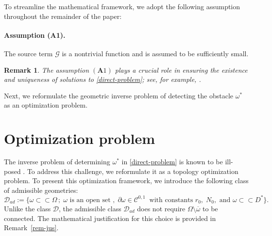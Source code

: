 \documentclass[a4paper,12pt,reqno,natbib]{amsart}
\newtheorem{remark}[theorem]{Remark}
\begin{document}
To streamline the mathematical framework, we adopt the following assumption throughout the remainder of the paper: 


\paragraph{\textbf{Assumption (A1).}}  
The source term \( \mathcal{G} \) is a nontrivial function and is assumed to be sufficiently small.



\begin{remark} The assumption $(\textbf{A}1)$ plays a crucial role in ensuring the existence and uniqueness of solutions to \eqref{direct-problem}; see, for example, \cite[Section 3.5.2]{temam1973theory}. 
\end{remark}



Next, we reformulate the geometric inverse problem of detecting the obstacle \( \omega^* \) as an optimization problem.






\section{Optimization problem}\label{sec:optimization-problem}

The inverse problem of determining $\omega^*$ in \eqref{direct-problem} is known to be ill-posed \cite{AlvarezIPPIP2005,doubova2007identification}. To address this challenge, we reformulate it as a topology optimization problem. To present this optimization framework, we introduce the following class of admissible geometries:
\begin{equation}\label{D-ad}
    \mathcal{D}_{ad}:=\big\{ \omega\subset\subset\Omega\,;\; \omega\text{ is an open set },\; \partial\omega\in\mathcal{C}^{0,1}\;\;\text{with constants } r_0,\; N_0,\text{ and } \omega\subset\subset D^* \big\}.
\end{equation}
Unlike the class $\mathcal{D}$, the admissible class $\mathcal{D}_{ad}$ does not require $\Omega \setminus \overline{\omega}$ to be connected. The mathematical justification for this choice is provided in Remark~\ref{rem-jus}.
\end{document}
